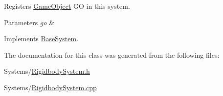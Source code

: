 Registers \hyperlink{classGameObject}{Game\+Object} GO in this system. 


\begin{DoxyParams}{Parameters}
{\em go} & \\
\hline
\end{DoxyParams}


Implements \hyperlink{classBaseSystem}{Base\+System}.



The documentation for this class was generated from the following files\+:\begin{DoxyCompactItemize}
\item 
Systems/\hyperlink{RigidbodySystem_8h}{Rigidbody\+System.\+h}\item 
Systems/\hyperlink{RigidbodySystem_8cpp}{Rigidbody\+System.\+cpp}\end{DoxyCompactItemize}
